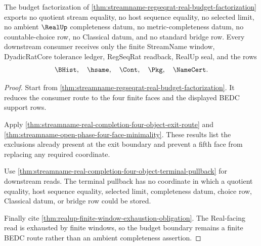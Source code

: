 \begin{theorem}
\label{thm:streamname-regseqrat-real-budget-nonescape}
The budget factorization of \autoref{thm:streamname-regseqrat-real-budget-factorization} exports no quotient stream equality, no host sequence equality, no selected limit, no ambient $\RealUp$ completeness datum, no metric-completeness datum, no countable-choice row, no Classical datum, and no standard bridge row. Every downstream consumer receives only the finite StreamName window, DyadicRatCore tolerance ledger, RegSeqRat readback, RealUp seal, and the rows
$$
\BHist,\quad \hsame,\quad \Cont,\quad \Pkg,\quad \NameCert.
$$
\end{theorem}
\begin{proof}
Start from \autoref{thm:streamname-regseqrat-real-budget-factorization}. It reduces the consumer route to the four finite faces and the displayed BEDC support rows.

Apply \autoref{thm:streamname-real-completion-four-object-exit-route} and \autoref{thm:streamname-open-phase-four-face-minimality}. These results list the exclusions already present at the exit boundary and prevent a fifth face from replacing any required coordinate.

Use \autoref{thm:streamname-real-completion-four-object-terminal-pullback} for downstream reads. The terminal pullback has no coordinate in which a quotient equality, host sequence equality, selected limit, completeness datum, choice row, Classical datum, or bridge row could be stored.

Finally cite \autoref{thm:realup-finite-window-exhaustion-obligation}. The Real-facing read is exhausted by finite windows, so the budget boundary remains a finite BEDC route rather than an ambient completeness assertion.
\end{proof}

